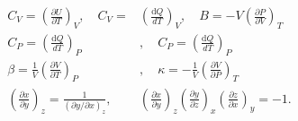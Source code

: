 \begin{align*}
C_V=\left(\frac{\partial U}{\partial T}\right)_V ,\quad C_V=&\left(\frac{\mathrm{d} Q}{d T}\right)_V, \quad B=-V\left(\frac{\partial P}{\partial V}\right)_T \\
C_P=\left(\frac{\mathrm{d} Q}{d T}\right)_P&,\quad C_P=\left(\frac{\mathrm{d} Q}{d T}\right)_P \\
\beta=\frac{1}{V}\left(\frac{\partial V}{\partial T}\right)_P&,\quad \kappa=-\frac{1}{V}\left(\frac{\partial V}{\partial P}\right)_T \\
\left(\frac{\partial x}{\partial y}\right)_z=\frac{1}{(\partial y / \partial x)_z},\quad &\left(\frac{\partial x}{\partial y}\right)_z\left(\frac{\partial y}{\partial z}\right)_x\left(\frac{\partial z}{\partial x}\right)_y=-1 .
\end{align*}